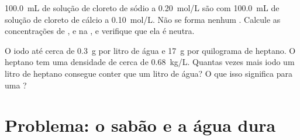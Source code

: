 \begin{exercise}[$\star\star\star$]\label{exo:g11:dissolution:14}
\qty{100.0}{mL} de solução de cloreto de sódio a \qty{0.20}{mol/L} são
 com \qty{100.0}{mL} de solução de cloreto de cálcio a
\qty{0.10}{mol/L}. Não se forma nenhum . Calcule as
concentrações de ,  e  na , e
verifique que ela é neutra.
\end{exercise}

\begin{exercise}[$\star\star\star$]\label{exo:g11:dissolution:15}
O iodo  até cerca de \qty{0.3}{g} por litro de água e
\qty{17}{g} por quilograma de heptano. O heptano tem uma densidade de
cerca de \qty{0.68}{kg/L}. Quantas vezes mais iodo um litro de heptano
consegue conter que um litro de água? O que isso significa para uma
?
\end{exercise}

\section{Problema: o sabão e a água dura}


